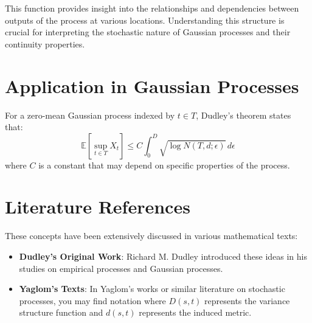 \documentclass{article}
\begin{document}
This function provides insight into the relationships and dependencies between outputs of the process at various locations. Understanding this structure is crucial for interpreting the stochastic nature of Gaussian processes and their continuity properties.

\section{Application in Gaussian Processes}
For a zero-mean Gaussian process indexed by $t \in T$, Dudley’s theorem states that:
\begin{equation}
\mathbb{E}\left[\sup_{t \in T} X_t\right] \leq C \int_0^{D} \sqrt{\log N(T, d; \epsilon)}\,d\epsilon
\end{equation}
where $C$ is a constant that may depend on specific properties of the process.

\section{Literature References}
These concepts have been extensively discussed in various mathematical texts:
\begin{itemize}
  \item \textbf{Dudley’s Original Work}: Richard M. Dudley introduced these ideas in his studies on empirical processes and Gaussian processes.
  \item \textbf{Yaglom's Texts}: In Yaglom's works or similar literature on stochastic processes, you may find notation where $D(s,t)$ represents the variance structure function and $d(s,t)$ represents the induced metric.
\end{itemize}
\end{document}
